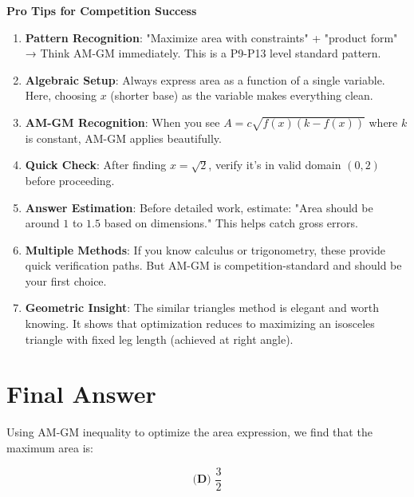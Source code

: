 \documentclass[12pt]{article}
\begin{document}
\begin{tipbox}
\textbf{Pro Tips for Competition Success}

\begin{enumerate}
    \item \textbf{Pattern Recognition}: "Maximize area with constraints" + "product form" → Think AM-GM immediately. This is a P9-P13 level standard pattern.
    
    \item \textbf{Algebraic Setup}: Always express area as a function of a single variable. Here, choosing $x$ (shorter base) as the variable makes everything clean.
    
    \item \textbf{AM-GM Recognition}: When you see $A = c\sqrt{f(x)(k-f(x))}$ where $k$ is constant, AM-GM applies beautifully.
    
    \item \textbf{Quick Check}: After finding $x = \sqrt{2}$, verify it's in valid domain $(0, 2)$ before proceeding.
    
    \item \textbf{Answer Estimation}: Before detailed work, estimate: "Area should be around $1$ to $1.5$ based on dimensions." This helps catch gross errors.
    
    \item \textbf{Multiple Methods}: If you know calculus or trigonometry, these provide quick verification paths. But AM-GM is competition-standard and should be your first choice.
    
    \item \textbf{Geometric Insight}: The similar triangles method is elegant and worth knowing. It shows that optimization reduces to maximizing an isosceles triangle with fixed leg length (achieved at right angle).
\end{enumerate}
\end{tipbox}

\section*{Final Answer}

Using AM-GM inequality to optimize the area expression, we find that the maximum area is:

\begin{equation*}
\boxed{\textbf{(D) } \frac{3}{2}}
\end{equation*}
\end{document}
